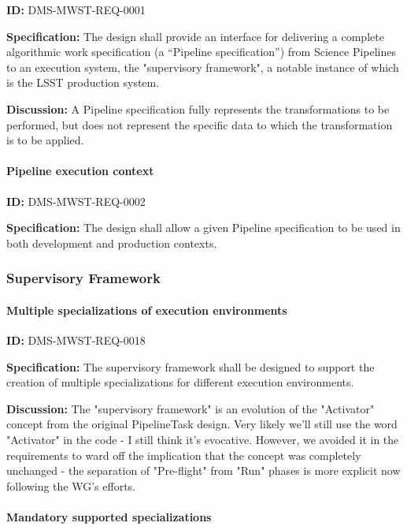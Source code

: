 \documentclass[SE,toc,lsstdraft]{lsstdoc}
\begin{document}
\label{DMS-MWST-REQ-0001}
\textbf{ID:} DMS-MWST-REQ-0001

\textbf{Specification:}
The design shall provide an interface for delivering a complete algorithmic work specification (a “Pipeline specification”) from Science Pipelines to an execution system, the "supervisory framework", a notable instance of which is the LSST production system.

\textbf{Discussion:}
A Pipeline specification fully represents the transformations to be performed, but does not represent the specific data to which the transformation is to be applied.

\paragraph{Pipeline execution context}\hfill  %

\label{DMS-MWST-REQ-0002}
\textbf{ID:} DMS-MWST-REQ-0002

\textbf{Specification:}
The design shall allow a given Pipeline specification to be used in both development and production contexts.

\subsubsection{Supervisory Framework}

\paragraph{Multiple specializations of execution environments}\hfill  %

\label{DMS-MWST-REQ-0018}
\textbf{ID:} DMS-MWST-REQ-0018

\textbf{Specification:}
The supervisory framework shall be designed to support the creation of multiple specializations for different execution environments.

\textbf{Discussion:}
The "supervisory framework" is an evolution of the "Activator" concept from the original PipelineTask design. Very likely we'll still use the word "Activator" in the code - I still think it's evocative. However, we avoided it in the requirements to ward off the implication that the concept was completely unchanged - the separation of "Pre-flight" from "Run" phases is more explicit now following the WG's efforts.

\paragraph{Mandatory supported specializations}\hfill  %
\end{document}
